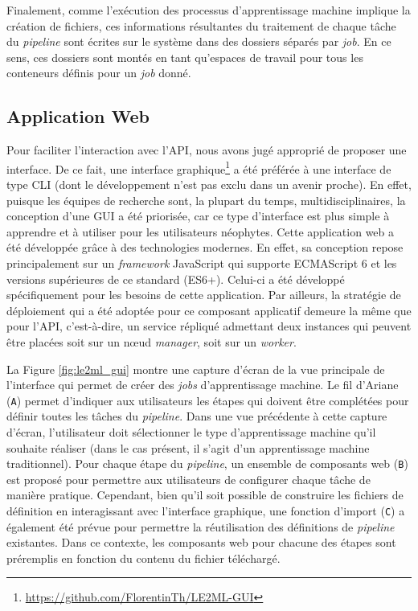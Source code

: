 Finalement, comme l'exécution des processus d'apprentissage machine implique la création de fichiers, ces informations résultantes du traitement de chaque tâche du \textit{pipeline} sont écrites sur le système dans des dossiers séparés par \emph{job}. En ce sens, ces dossiers sont montés en tant qu'espaces de travail pour tous les conteneurs définis pour un \emph{job} donné.

\subsection{Application Web}

Pour faciliter l'interaction avec l'\acs{API}, nous avons jugé approprié de proposer une interface. De ce fait, une interface graphique\footnote{\url{https://github.com/FlorentinTh/LE2ML-GUI}} a été préférée à une interface de type \acs{CLI} (dont le développement n'est pas exclu dans un avenir proche). En effet, puisque les équipes de recherche sont, la plupart du temps, multidisciplinaires, la conception d'une \acs{GUI} a été priorisée, car ce type d'interface est plus simple à apprendre et à utiliser pour les utilisateurs néophytes. Cette application web a été développée grâce à des technologies modernes. En effet, sa conception repose principalement sur un \textit{framework} JavaScript qui supporte ECMAScript 6 et les versions supérieures de ce standard (ES6+). Celui-ci a été développé spécifiquement pour les besoins de cette application. Par ailleurs, la stratégie de déploiement qui a été adoptée pour ce composant applicatif demeure la même que pour l'\acs{API}, c'est-à-dire, un service répliqué admettant deux instances qui peuvent être placées soit sur un n\oe{}ud \textit{manager}, soit sur un \textit{worker}.

La Figure \ref{fig:le2ml_gui} montre une capture d'écran de la vue principale de l'interface qui permet de créer des \textit{jobs} d'apprentissage machine. Le fil d'Ariane (\texttt{A}) permet d'indiquer aux utilisateurs les étapes qui doivent être complétées pour définir toutes les tâches du \textit{pipeline}. Dans une vue précédente à cette capture d'écran, l'utilisateur doit sélectionner le type d'apprentissage machine qu'il souhaite réaliser (dans le cas présent, il s'agit d'un apprentissage machine traditionnel). Pour chaque étape du \textit{pipeline}, un ensemble de composants web (\texttt{B}) est proposé pour permettre aux utilisateurs de configurer chaque tâche de manière pratique. Cependant, bien qu'il soit possible de construire les fichiers de définition en interagissant avec l'interface graphique, une fonction d'import (\texttt{C}) a également été prévue pour permettre la réutilisation des définitions de \textit{pipeline} existantes. Dans ce contexte, les composants web pour chacune des étapes sont préremplis en fonction du contenu du fichier téléchargé.

